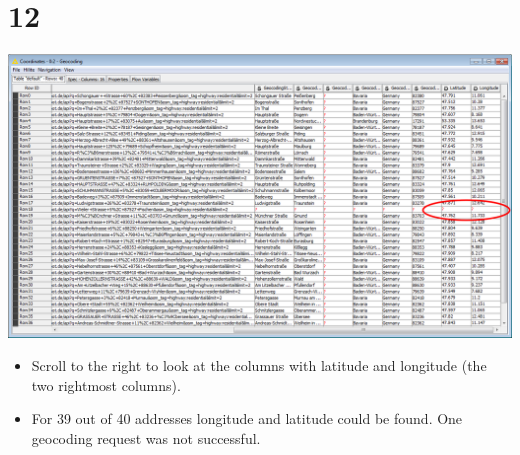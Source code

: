 \documentclass[10pt]{beamer}
\begin{document}
\section{12}
\begin{frame}
	\begin{center}
  		\includegraphics[height=0.6\textheight]{12.png}
	\end{center}
	\begin{itemize}
		\item Scroll to the right to look at the columns with latitude and longitude (the two rightmost columns).
		\item For 39 out of 40 addresses longitude and latitude could be found. One geocoding request was not successful.
	\end{itemize}
\end{frame}
\end{document}

